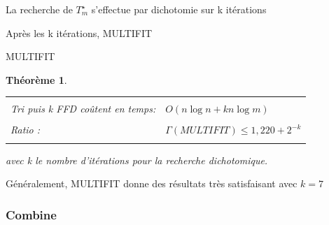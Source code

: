 \documentclass[a4paper,12pt]{report}
\theoremstyle{plain}				%
\newtheorem{theoreme}{Théorème}	%
\theoremstyle{definition}				%
\newcommand{\tdi}[1]{\todo[inline]{{#1}}{}}
\newcommand{\lp}[1]{\todo[author=LP,color=yellow,inline]{#1}}
\begin{document}
\bigskip

\begin{algorithm}[H]
\DontPrintSemicolon
{}

\BlankLine %
La recherche de $T_m^\star$ s'effectue par dichotomie sur k itérations

\BlankLine %
Après les k itérations, MULTIFIT  \\

\caption{MULTIFIT\label{algo:MULTIFIT}}
\end{algorithm}

\bigskip

\begin{theoreme}
\begin{flushleft}
\begin{tabular}{|p{8cm}p{6cm}|}
\hline
& \\
Tri puis k FFD coûtent en temps: & $O(n \log n + kn \log m)$
\\	%
& \\
Ratio \cite{lee1988multiprocessor}:& $\Gamma(MULTIFIT) \leq 1,220 + 2^{-k}$
\\
& \\
\hline
\end{tabular}
\end{flushleft}
avec k le nombre d'itérations pour la recherche dichotomique.
\end{theoreme}

Généralement, MULTIFIT donne des résultats très satisfaisant avec $k = 7$


\subsubsection{Combine}
\end{document}

